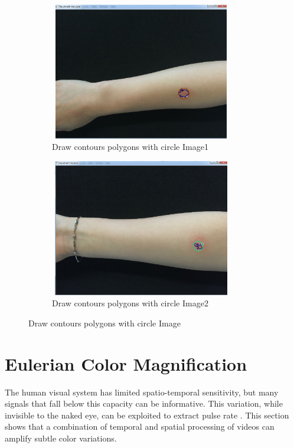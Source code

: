  \begin{figure}[!h]
\centering
\begin{subfigure}{.5\textwidth}
  \centering
  \includegraphics[width=8cm,height=6cm]{img/detectresult1circle}
  \caption{Draw contours polygons with circle Image1}
  \label{fig:sub1}
\end{subfigure}%
\begin{subfigure}{.5\textwidth}
  \centering
  \includegraphics[width=8cm,height=6cm]{img/detectresult1circle2}
  \caption{Draw contours polygons with circle Image2}
  \label{fig:sub2}
\end{subfigure}
\caption{Draw contours polygons with circle Image}
\label{fig:test}
\end{figure}

\newpage
\section{Eulerian Color Magnification}
The human visual system has limited spatio-temporal sensitivity, but many signals that fall below this capacity can be informative.  This variation, while invisible to the naked eye, can be exploited to extract pulse rate \cite{Verkruysse} \cite{Poh}. This section shows that a combination of temporal and spatial processing of videos can amplify subtle color variations.\\

